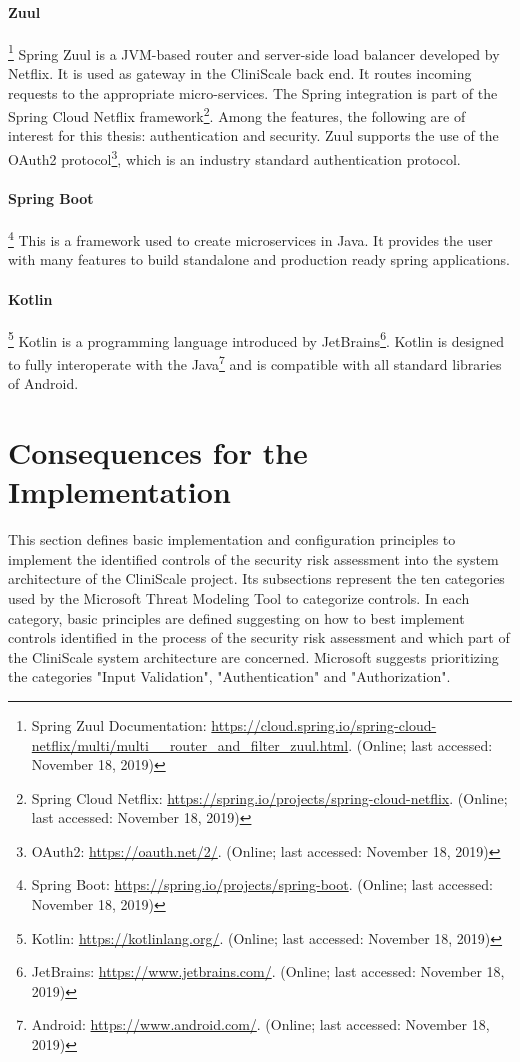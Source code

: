 \paragraph{Zuul}\footnote{Spring Zuul Documentation: \url{https://cloud.spring.io/spring-cloud-netflix/multi/multi__router_and_filter_zuul.html}. (Online; last accessed:  November 18, 2019)} Spring Zuul is a JVM-based router and server-side load balancer developed by Netflix. It is used as gateway in the CliniScale back end. It routes incoming requests to the appropriate micro-services. The Spring integration is part of the Spring Cloud Netflix framework\footnote{Spring Cloud Netflix: \url{https://spring.io/projects/spring-cloud-netflix}. (Online; last accessed:  November 18, 2019)}. Among the features, the following are of interest for this thesis: authentication and security. Zuul supports the use of the OAuth2 protocol\footnote{OAuth2: \url{https://oauth.net/2/}. (Online; last accessed:  November 18, 2019)}, which is an industry standard authentication protocol.

\paragraph{Spring Boot}\footnote{Spring Boot: \url{https://spring.io/projects/spring-boot}. (Online; last accessed:  November 18, 2019)} This is a framework used to create microservices in Java. It provides the user with many features to build standalone and production ready spring applications.

\paragraph{Kotlin}\footnote{Kotlin: \url{https://kotlinlang.org/}. (Online; last accessed:  November 18, 2019)} Kotlin is a programming language introduced by JetBrains\footnote{JetBrains: \url{https://www.jetbrains.com/}. (Online; last accessed:  November 18, 2019)}. Kotlin is designed to fully interoperate with the Java\footnote{Android: \url{https://www.android.com/}. (Online; last accessed:  November 18, 2019)} and is compatible with all standard libraries of Android.

\section{Consequences for the Implementation}
\label{implementationconsequences}

This section defines basic implementation and configuration principles to implement the identified controls of the security risk assessment into the system architecture of the CliniScale project. Its subsections represent the ten categories used by the Microsoft Threat Modeling Tool to categorize controls. In each category, basic principles are defined suggesting on how to best implement controls identified in the process of the security risk assessment and which part of the CliniScale system architecture are concerned. Microsoft suggests prioritizing the categories "Input Validation", "Authentication" and "Authorization". 


